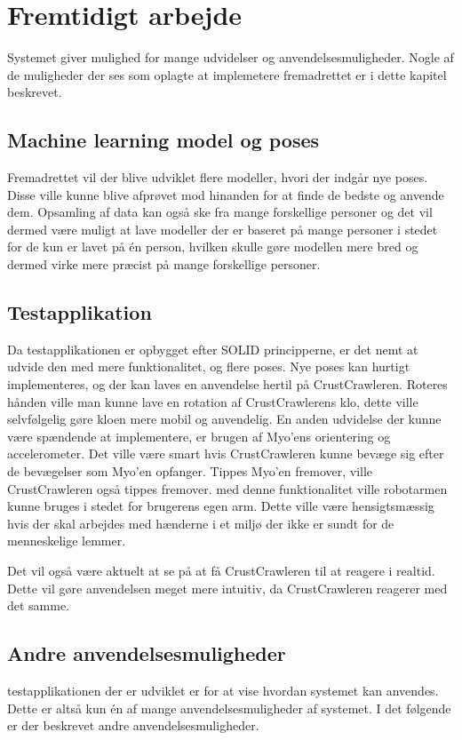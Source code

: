 \thispagestyle{fancy}
\chapter{Fremtidigt arbejde}
\label{chp:fremtidigtarbejde}
Systemet giver mulighed for mange udvidelser og anvendelsesmuligheder. Nogle af de muligheder der ses som oplagte at implemetere fremadrettet er i dette kapitel beskrevet.

\section{Machine learning model og poses}
Fremadrettet vil der blive udviklet flere modeller, hvori der indgår nye poses. Disse ville kunne blive afprøvet mod hinanden for at finde de bedste og anvende dem. Opsamling af data kan også ske fra mange forskellige personer og det vil dermed være muligt at lave modeller der er baseret på mange personer i stedet for de kun er lavet på én person, hvilken skulle gøre modellen mere bred og dermed virke mere præcist på mange forskellige personer.

\section{Testapplikation}
Da testapplikationen er opbygget efter SOLID principperne\citep{RefWorks:10}, er det nemt at udvide den med mere funktionalitet, og flere poses. Nye poses kan hurtigt implementeres, og der kan laves en anvendelse hertil på CrustCrawleren. Roteres hånden ville man kunne lave en rotation af CrustCrawlerens klo, dette ville selvfølgelig gøre kloen mere mobil og anvendelig. En anden udvidelse der kunne være spændende at implementere, er brugen af Myo'ens orientering og accelerometer. Det ville være smart hvis CrustCrawleren kunne bevæge sig efter de bevægelser som Myo'en opfanger. Tippes Myo'en fremover, ville CrustCrawleren også tippes fremover. med denne funktionalitet ville robotarmen kunne bruges i stedet for brugerens egen arm. Dette ville være hensigtsmæssig hvis der skal arbejdes med hænderne i et miljø der ikke er sundt for de menneskelige lemmer.

Det vil også være aktuelt at se på at få CrustCrawleren til at reagere i realtid. Dette vil gøre anvendelsen meget mere intuitiv, da CrustCrawleren reagerer med det samme.


\section{Andre anvendelsesmuligheder}
testapplikationen der er udviklet er for at vise hvordan systemet kan anvendes. Dette er altså kun én af mange anvendelsesmuligheder af systemet. I det følgende er der beskrevet andre anvendelsesmuligheder.

